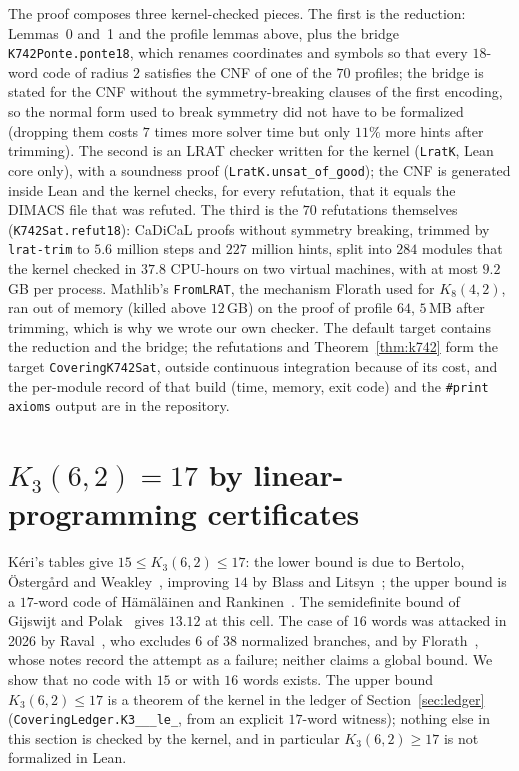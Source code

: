 \documentclass[11pt]{amsart}
\theoremstyle{definition}
\theoremstyle{remark}
\begin{document}
The proof composes three kernel-checked pieces.
The first is the reduction: Lemmas~0 and~1 and the profile lemmas above, plus the bridge \texttt{K742Ponte.\allowbreak ponte18}, which renames coordinates and symbols so that every $18$-word code of radius $2$ satisfies the CNF of one of the $70$ profiles; the bridge is stated for the CNF without the symmetry-breaking clauses of the first encoding, so the normal form used to break symmetry did not have to be formalized (dropping them costs $7$ times more solver time but only $11\%$ more hints after trimming).
The second is an LRAT checker written for the kernel (\texttt{LratK}, Lean core only), with a soundness proof (\texttt{LratK.\allowbreak unsat\_\allowbreak of\_\allowbreak good}); the CNF is generated inside Lean and the kernel checks, for every refutation, that it equals the DIMACS file that was refuted.
The third is the $70$ refutations themselves (\texttt{K742Sat.\allowbreak refut18}): CaDiCaL proofs without symmetry breaking, trimmed by \texttt{lrat-trim} to $5.6$ million steps and $227$ million hints, split into $284$ modules that the kernel checked in $37.8$ CPU-hours on two virtual machines, with at most $9.2$\,GB per process.
Mathlib's \texttt{FromLRAT}, the mechanism Florath used for $K_8(4,2)$, ran out of memory (killed above $12$\,GB) on the proof of profile $64$, $5$\,MB after trimming, which is why we wrote our own checker.
The default target contains the reduction and the bridge; the refutations and Theorem~\ref{thm:k742} form the target \texttt{CoveringK742Sat}, outside continuous integration because of its cost, and the per-module record of that build (time, memory, exit code) and the \texttt{\#print axioms} output are in the repository.

\section{$K_3(6,2)=17$ by linear-programming certificates}\label{sec:k362}
Kéri's tables give $15\le K_3(6,2)\le 17$: the lower bound is due to Bertolo, Östergård and Weakley~\cite{bow2004}, improving $14$ by Blass and Litsyn~\cite{bl1998}; the upper bound is a $17$-word code of Hämäläinen and Rankinen~\cite{hr1991}.
The semidefinite bound of Gijswijt and Polak~\cite{gp2025} gives $13.12$ at this cell. The case of $16$ words was attacked in 2026 by Raval~\cite{raval2026}, who excludes $6$ of $38$ normalized branches, and by Florath~\cite{florath2026}, whose notes record the attempt as a failure; neither claims a global bound.
We show that no code with $15$ or with $16$ words exists.
The upper bound $K_3(6,2)\le 17$ is a theorem of the kernel in the ledger of Section~\ref{sec:ledger} (\texttt{CoveringLedger.\allowbreak K3\_\_\_\allowbreak le\_}, from an explicit $17$-word witness); nothing else in this section is checked by the kernel, and in particular $K_3(6,2)\ge 17$ is not formalized in Lean.
\end{document}
